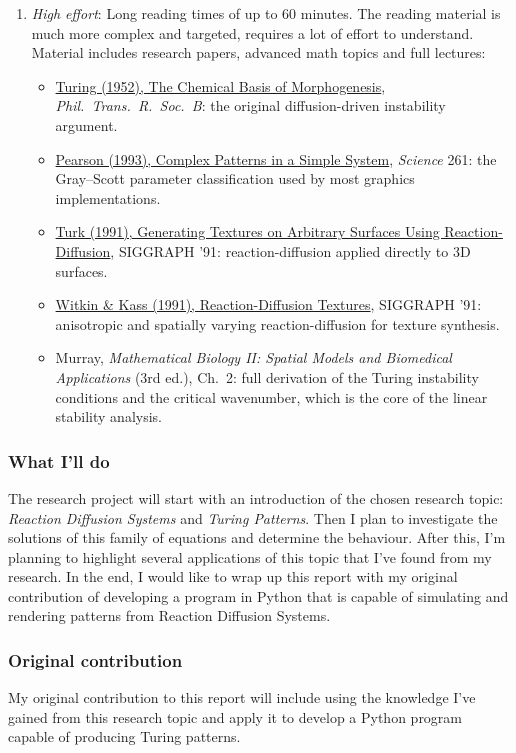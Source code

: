 \documentclass[a4paper, 11pt]{article}
\begin{document}
\begin{enumerate}
  \item \emph{High effort}: Long reading times of up to 60 minutes. The reading material is much more complex and targeted, requires a lot of effort to understand. Material includes research papers, advanced math topics and full lectures:
  \begin{itemize}
    \item \href{https://doi.org/10.1098/rstb.1952.0012}{Turing (1952), The Chemical Basis of Morphogenesis}, \emph{Phil.\ Trans.\ R.\ Soc.\ B}: the original diffusion-driven instability argument.
    \item \href{https://arxiv.org/abs/patt-sol/9304003}{Pearson (1993), Complex Patterns in a Simple System}, \emph{Science} 261: the Gray--Scott parameter classification used by most graphics implementations.
    \item \href{https://doi.org/10.1145/122718.122749}{Turk (1991), Generating Textures on Arbitrary Surfaces Using Reaction-Diffusion}, SIGGRAPH '91: reaction-diffusion applied directly to 3D surfaces.
    \item \href{https://doi.org/10.1145/122718.122750}{Witkin \& Kass (1991), Reaction-Diffusion Textures}, SIGGRAPH '91: anisotropic and spatially varying reaction-diffusion for texture synthesis.
    \item Murray, \emph{Mathematical Biology II: Spatial Models and Biomedical Applications} (3rd ed.), Ch.\ 2: full derivation of the Turing instability conditions and the critical wavenumber, which is the core of the linear stability analysis.
  \end{itemize}
\end{enumerate}

\subsubsection*{What I'll do}
The research project will start with an introduction of the chosen research topic: \emph{Reaction Diffusion Systems} and \emph{Turing Patterns}. Then I plan to investigate the solutions of this family of equations and determine the behaviour. After this, I'm planning to highlight several applications of this topic that I've found from my research. In the end, I would like to wrap up this report with my original contribution of developing a program in Python that is capable of simulating and rendering patterns from Reaction Diffusion Systems.

\subsubsection*{Original contribution}
My original contribution to this report will include using the knowledge I've gained from this research topic and apply it to develop a Python program capable of producing Turing patterns.
\end{document}
